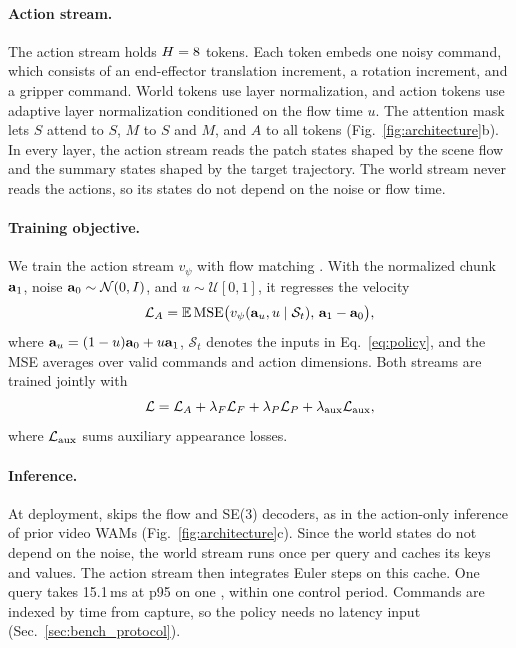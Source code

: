 \paragraph{Action stream.}
The action stream holds $H=8$ tokens. Each token embeds one noisy command, which
consists of an end-effector translation increment, a rotation increment, and a gripper
command. World tokens use layer normalization, and
action tokens use adaptive layer normalization conditioned on the flow time $u$. The
attention mask lets $S$ attend to $S$, $M$ to $S$ and $M$, and $A$ to all tokens
(Fig.~\ref{fig:architecture}b). In every layer, the action stream reads the patch
states shaped by the scene flow and the summary states shaped by the target trajectory.
The world stream never reads the actions, so its states do not depend on the noise or
flow time.

\paragraph{Training objective.}
We train the action stream $v_\psi$ with flow matching \cite{flowmatching}.
With the normalized chunk $\mathbf{a}_1$, noise $\mathbf{a}_0\sim\mathcal N(0,I)$, and
$u\sim\mathcal U[0,1]$, it regresses the velocity
\begin{equation}
\mathcal L_A=\mathbb E\,\mathrm{MSE}\big(v_\psi(\mathbf{a}_u,u\mid\mathcal S_t),\,\mathbf{a}_1-\mathbf{a}_0\big),
\label{eq:fm}
\end{equation}
where $\mathbf{a}_u=(1-u)\mathbf{a}_0+u\mathbf{a}_1$, $\mathcal S_t$ denotes the inputs in
Eq.~\eqref{eq:policy}, and the MSE averages over valid commands and action dimensions. Both streams are trained jointly with
\begin{equation}
\mathcal L=\mathcal L_A+\lambda_F\mathcal L_F+\lambda_P\mathcal L_P+\lambda_{\rm aux}\mathcal L_{\rm aux},
\label{eq:total}
\end{equation}
where $\mathcal L_{\rm aux}$ sums auxiliary appearance losses.

\paragraph{Inference.}
\label{sec:inference}
At deployment, \ours skips the flow and SE(3) decoders, as in the action-only inference
of prior video WAMs \cite{uva,fastwam} (Fig.~\ref{fig:architecture}c). Since the world states
do not depend on the noise, the world stream runs once per query and caches its keys
and values. The action stream then integrates \cfgEuler{} Euler steps
on this cache. One query takes 15.1\,ms at p95 on one \cfgGPU{}, within one control
period. Commands are indexed by time from capture, so the policy needs no latency input
(Sec.~\ref{sec:bench_protocol}).
